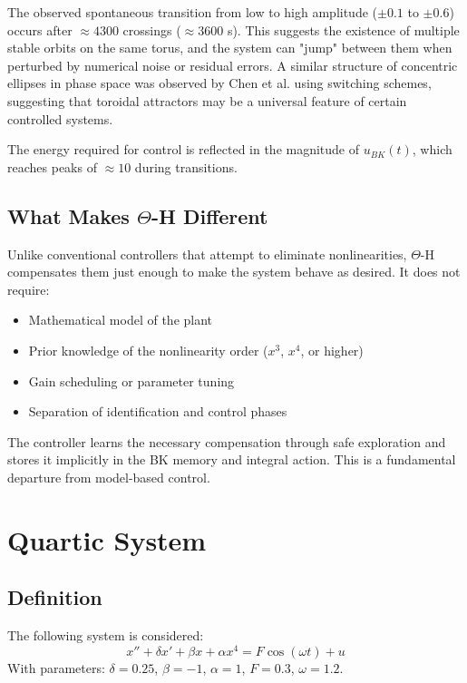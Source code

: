 \documentclass[twocolumn]{article}
\begin{document}
The observed spontaneous transition from low to high amplitude ($\pm 0.1$ 
to $\pm 0.6$) occurs after $\approx 4300$ crossings ($\approx 3600$ s). 
This suggests the existence of multiple stable orbits on the same 
torus, and the system can "jump" between them when perturbed by numerical 
noise or residual errors. A similar structure of concentric ellipses 
in phase space was observed by Chen et al. \cite{Chen2007} using 
switching schemes, suggesting that toroidal attractors may be a 
universal feature of certain controlled systems.

The energy required for control is reflected in the magnitude of 
$u_{BK}(t)$, which reaches peaks of $\approx 10$ during transitions.

\subsection{What Makes $\Theta$-H Different}

Unlike conventional controllers that attempt to eliminate 
nonlinearities, $\Theta$-H compensates them just enough to make 
the system behave as desired. It does not require:

\begin{itemize}
    \item Mathematical model of the plant
    \item Prior knowledge of the nonlinearity order ($x^3$, $x^4$, or higher)
    \item Gain scheduling or parameter tuning
    \item Separation of identification and control phases
\end{itemize}

The controller learns the necessary compensation through safe 
exploration and stores it implicitly in the BK memory and integral 
action. This is a fundamental departure from model-based control.

\section{Quartic System}
\label{sec:system}

\subsection{Definition}

The following system is considered:
\begin{equation}
x'' + \delta x' + \beta x + \alpha x^4 = F \cos(\omega t) + u
\label{eq:quartic}
\end{equation}
With parameters: $\delta = 0.25$, $\beta = -1$, $\alpha = 1$, $F = 0.3$, 
$\omega = 1.2$.
\end{document}
